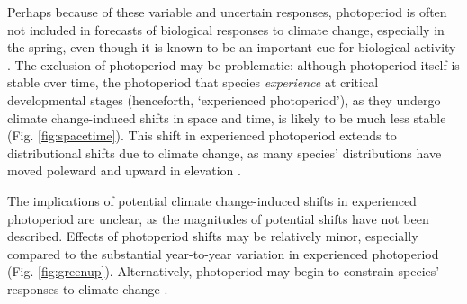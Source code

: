 \documentclass{article}
\begin{document}
\par Perhaps because of these variable and uncertain responses, photoperiod is often not included in forecasts of biological responses to climate change, especially in the spring, even though it is known to be an important cue for biological activity \citep[but see ][]{duputie2015,grevstad2015,Caffarra:2011qf}. The exclusion of photoperiod may be problematic: although photoperiod itself is stable over time, the photoperiod that species \emph{experience} at critical developmental stages (henceforth, `experienced photoperiod'), as they undergo climate change-induced shifts in space and time, is likely to be much less stable (Fig. \ref{fig:spacetime}). This shift in experienced photoperiod extends to distributional shifts due to climate change, as many species' distributions have moved poleward and upward in elevation \citep[i.e., range shifts,][]{chen2011,harsch2009,parmesan2006,penuelas2003}. %

\par The implications of potential climate change-induced shifts in experienced photoperiod are unclear, as the magnitudes of potential shifts have not been described. Effects of photoperiod shifts may be relatively minor, especially compared to the substantial year-to-year variation in experienced photoperiod (Fig. \ref{fig:greenup}). Alternatively, photoperiod may begin to constrain species' responses to climate change \citep{huffeldt2020,fu2015,way2015,Basler:2012,koerner2010a}.
\end{document}

